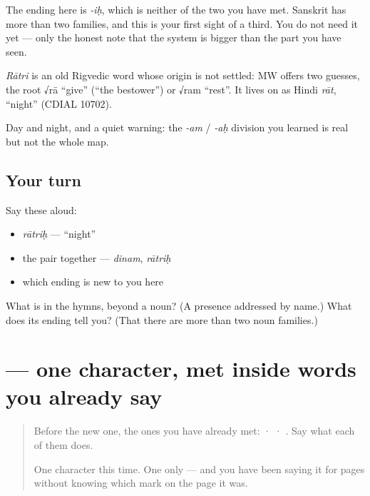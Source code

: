 The ending here is \emph{-iḥ}, which is neither of the two you have met. Sanskrit has more than two families, and this is your first sight of a third. You do not need it yet — only the honest note that the system is bigger than the part you have seen.

\begin{cousinweb}
\emph{Rātri} is an old Rigvedic word whose origin is not settled: MW offers two guesses, the root √rā \textquotedblleft{}give\textquotedblright{} (\textquotedblleft{}the bestower\textquotedblright{}) or √ram \textquotedblleft{}rest\textquotedblright{}. It lives on as Hindi \emph{rāt}, \textquotedblleft{}night\textquotedblright{} (CDIAL 10702).
\end{cousinweb}

\begin{grammarlens}[title={What you've built}]
Day and night, and a quiet warning: the \emph{-am} / \emph{-aḥ} division you learned is real but not the whole map.
\end{grammarlens}

\subsection*{Your turn}
Say these aloud:

\begin{itemize}
\raggedright
  \item \emph{rātriḥ} — \textquotedblleft{}night\textquotedblright{}
  \item the pair together — \emph{dinam}, \emph{rātriḥ}
  \item which ending is new to you here
\end{itemize}

\begin{tcolorbox}[breakable,colback=teal!4,colframe=teal!35!black,title={Before you move on}]
What is  in the hymns, beyond a noun? (A presence addressed by name.) What does its ending tell you? (That there are more than two noun families.)
\end{tcolorbox}
\section[\texorpdfstring{\sk{श} (śa)}{श (śa)}]{ — one character, met inside words you already say}

\label{lesson:SA-S219-letter-sha}



\begin{quote}
Before the new one, the ones you have already met:  ·  · . Say what each of them does.

One character this time. One only — and you have been saying it for pages without knowing which mark on the page it was.
\end{quote}

